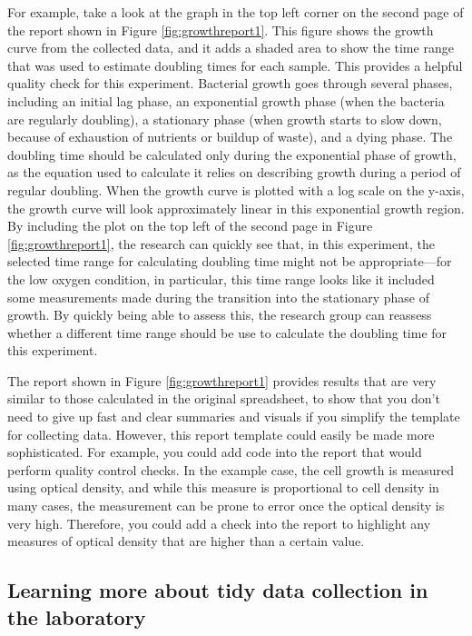 \documentclass[]{tufte-book}
\begin{document}
For example, take a look at the graph in the top left corner on the second page
of the report shown in Figure \ref{fig:growthreport1}. This figure shows the
growth curve from the collected data, and it adds a shaded area to show the time
range that was used to estimate doubling times for each sample. This provides a
helpful quality check for this experiment. Bacterial growth goes through several
phases, including an initial lag phase, an exponential growth phase (when the
bacteria are regularly doubling), a stationary phase (when growth starts to slow
down, because of exhaustion of nutrients or buildup of waste), and a dying
phase. The doubling time should be calculated only during the exponential phase
of growth, as the equation used to calculate it relies on describing growth during
a period of regular doubling. When the growth curve is plotted with a log scale on
the y-axis, the growth curve will look approximately linear in this exponential
growth region. By including the plot on the top left of the second page in
Figure \ref{fig:growthreport1}, the research can quickly see that, in this
experiment, the selected time range for calculating doubling time might not be
appropriate---for the low oxygen condition, in particular, this time range looks
like it included some measurements made during the transition into the stationary
phase of growth. By quickly being able to assess this, the research group
can reassess whether a different time range should be use to calculate the
doubling time for this experiment.

The report shown in Figure \ref{fig:growthreport1} provides results that are
very similar to those calculated in the original spreadsheet, to show that
you don't need to give up fast and clear summaries and visuals if you simplify
the template for collecting data. However, this report template could easily be
made more sophisticated. For example, you could add code into the report that
would perform quality control checks. In the example case, the cell growth is
measured using optical density, and while this measure is proportional to cell
density in many cases, the measurement can be prone to error once the optical
density is very high. Therefore, you could add a check into the report to
highlight any measures of optical density that are higher than a certain value.

\hypertarget{learning-more-about-tidy-data-collection-in-the-laboratory}{%
\subsection{Learning more about tidy data collection in the laboratory}\label{learning-more-about-tidy-data-collection-in-the-laboratory}}
\end{document}
